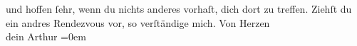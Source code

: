 \begin{ledgroupsized}[t]{13cm}
               und hoffen ſehr, wenn du nichts anderes vorhaſt, dich dort zu treffen.\pend
           \pstart
           Ziehſt du ein andres Rendezvous vor, so verſtändige mich.\pend
           \pstart
           Von Herzen{\\[\baselineskip]}dein \spacefill\mbox{Arthur}\pend
           \leftskip=0em{}          \endnumbering{}\end{ledgroupsized}  \newcommand{\dateiname}{L01427}\newcommand{\titel}{Arthur Schnitzler an Hermann Bahr, 17. 8. 1904}\newcommand{\editorInnen}{ Kurt Ifkovits,  Martin Anton Müller}
            \footnotesize
\begin{ledgroupsized}[t]{11.5cm}
\end{ledgroupsized}
         
      